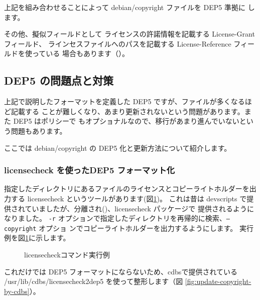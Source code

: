 \documentclass[mingoth,a4paper]{jsarticle}
\begin{document}
上記を組み合わせることによって debian/copyright ファイルを DEP5 準拠に
します。

その他、擬似フィールドとして ライセンスの許諾情報を記載する License-Grant フィールド、
ラインセスファイルへのパスを記載する License-Reference フィールドを使っている
場合もあります（）。

\subsection{DEP5 の問題点と対策}

上記で説明したフォーマットを定義した DEP5 ですが、ファイルが多くなるほど記載する
ことが難しくなり、あまり更新されないという問題があります。また DEP5 はポリシーで
もオプショナルなので、移行があまり進んでいないという問題もあります。

ここでは debian/copyright の DEP5 化と更新方法について紹介します。

\subsubsection{licensecheck を使ったDEP5 フォーマット化}

指定したディレクトリにあるファイルのライセンスとコピーライトホルダーを出力する
licensecheck というツールがあります(図\ref{fig:licensecheck})。
これは昔は devscripts で提供されていましたが、分離され()、licensecheck パッケージで
提供されるようになりました。
\texttt{-r} オプションで指定したディレクトリを再帰的に検索、\texttt{--copyright} オプショ
ンでコピーライトホルダーを出力するようにします。
実行例を図\ref{fig:licensecheck}に示します。

\begin{figure}[htbp]
\begin{center}
\end{center}
\caption{licensecheckコマンド実行例}
\label{fig:licensecheck}
\end{figure}

これだけでは DEP5 フォーマットにならないため、cdbsで提供されている
/usr/lib/cdbs/licensecheck2dep5 を使って整形します（図
\ref{fig:update-copyright-by-cdbs}）。
\end{document}
